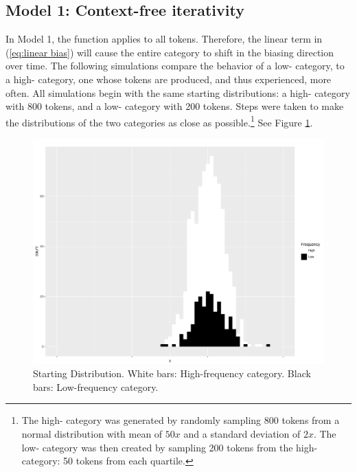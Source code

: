 \subsection{Model 1: Context-free iterativity}\label{subsec:Model-1:-Context-Free}

In Model 1, the  function applies to all tokens. Therefore, the
linear  term in (\ref{eq:linear bias}) will cause the entire
category to shift in the biasing direction over time. The following
simulations compare the behavior of a low- category, to a
high- category, one whose tokens are produced, and thus experienced,
more often. All simulations begin with the same starting distributions:
a high- category with 800 tokens, and a low- category
with 200 tokens. Steps were taken to make the distributions of the
two categories as close as possible.\footnote{The high- category was generated by randomly sampling 800
tokens from a normal distribution with mean of $50x$ and a standard
deviation of $2x$. The low- category was then created by
sampling 200 tokens from the high- category: 50 tokens from
each quartile.} See Figure \ref{fig:Frequency Starting Dist}. 

\begin{figure}[H]
\centering{}\includegraphics[scale=0.25]{figures/startCon.pdf}\caption{\label{fig:Frequency Starting Dist}Starting Distribution. White bars:
High-frequency category. Black bars: Low-frequency category.}
\end{figure}

